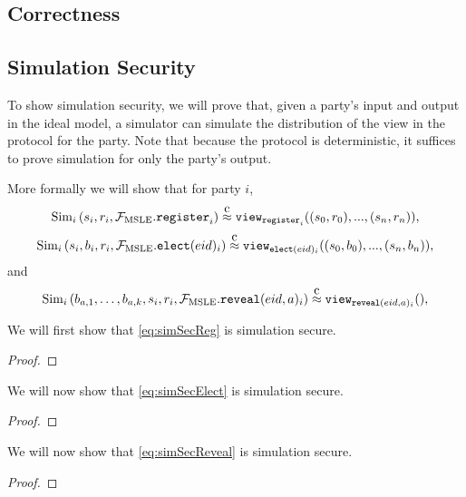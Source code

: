 \subsection{Correctness}

\subsection{Simulation Security}
To show simulation security, we will prove that, given a party's input and output in the ideal model,
a simulator can simulate the distribution of the view in the protocol for the party. Note that because the 
protocol is deterministic, it suffices to prove simulation for only the party's output.

More formally we will show that for party $i$,
\begin{equation}
	\label{eq:simSecReg}
	\simulator_i\left(s_i, r_i, \idealMSLE.\register_i\right) \compInd \texttt{view}_{\register_i}((s_0, r_0), ..., (s_n, r_n)),
\end{equation}
\begin{equation}
	\label{eq:simSecElect}
	\simulator_i\left(s_i, b_i, r_i, \idealMSLE.\elect_i\right) \compInd \texttt{view}_{\elect_i}((s_0, b_0), ..., (s_n, b_n)),
\end{equation}
and
\begin{equation}
	\label{eq:simSecReveal}
	\simulator_i\left(b_{a, 1}, \dots, b_{a, k}, s_i, r_i, \idealMSLE.\reveal_i\right) \compInd \texttt{view}_{\reveal_i}(),
\end{equation}

\begin{lemma}
	We will first show that \cref{eq:simSecReg} is simulation secure.
	\begin{proof}
		
	\end{proof}
\end{lemma}


\begin{lemma}
	We will now show that \cref{eq:simSecElect} is simulation secure.
	\begin{proof}

	\end{proof}
\end{lemma}

\begin{lemma}
	We will now show that \cref{eq:simSecReveal} is simulation secure.
	\begin{proof}

	\end{proof}
\end{lemma}

